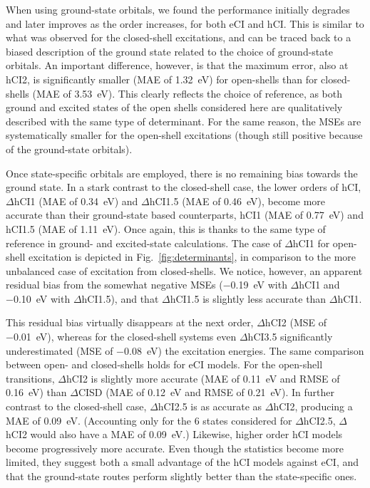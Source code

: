 \documentclass[aip,jcp,reprint,noshowkeys,superscriptaddress]{revtex4-1}
\begin{document}
When using ground-state orbitals, we found the performance initially degrades and later improves as the order increases, for both eCI and hCI.
This is similar to what was observed for the closed-shell excitations, 
and can be traced back to a biased description of the ground state related to the choice of ground-state orbitals.
An important difference, however, is that the maximum error, also at hCI2, is significantly smaller (MAE of \SI{1.32}{\eV}) for open-shells
than for closed-shells (MAE of \SI{3.53}{\eV}).
This clearly reflects the choice of reference, as both ground and excited states of the open shells considered here are qualitatively described with the same type of determinant.
For the same reason, the MSEs are systematically smaller for the open-shell excitations (though still positive because of the ground-state orbitals).

Once state-specific orbitals are employed, there is no remaining bias towards the ground state.
In a stark contrast to the closed-shell case, the lower orders of hCI, $\Delta$hCI1 (MAE of \SI{0.34}{\eV}) and $\Delta$hCI1.5 (MAE of \SI{0.46}{\eV}), 
become more accurate than their ground-state based counterparts, hCI1 (MAE of \SI{0.77}{\eV}) and hCI1.5 (MAE of \SI{1.11}{\eV}).
Once again, this is thanks to the same type of reference in ground- and excited-state calculations.
The case of $\Delta$hCI1 for open-shell excitation is depicted in Fig.~\ref{fig:determinants}, in comparison to the more unbalanced case of excitation from closed-shells.
We notice, however, an apparent residual bias from the somewhat negative MSEs (\SI{-0.19}{\eV} with $\Delta$hCI1 and \SI{-0.10}{\eV} with $\Delta$hCI1.5),
and that $\Delta$hCI1.5 is slightly less accurate than $\Delta$hCI1.

This residual bias virtually disappears at the next order, $\Delta$hCI2 (MSE of \SI{-0.01}{\eV}), 
whereas for the closed-shell systems even $\Delta$hCI3.5 significantly underestimated (MSE of \SI{-0.08}{\eV}) the excitation energies. 
The same comparison between open- and closed-shells holds for eCI models.
For the open-shell transitions, $\Delta$hCI2 is slightly more accurate (MAE of \SI{0.11}{\eV} and RMSE of \SI{0.16}{\eV}) than $\Delta$CISD (MAE of \SI{0.12}{\eV} and RMSE of \SI{0.21}{\eV}).
In further contrast to the closed-shell case,
$\Delta$hCI2.5 is as accurate as $\Delta$hCI2, producing a MAE of \SI{0.09}{\eV}.
(Accounting only for the 6 states considered for $\Delta$hCI2.5, $\Delta$hCI2 would also have a MAE of \SI{0.09}{\eV}.)
Likewise, higher order hCI models become progressively more accurate.
Even though the statistics become more limited,
they suggest both a small advantage of the hCI models against eCI,
and that the ground-state routes perform slightly better than the state-specific ones.
\end{document}
